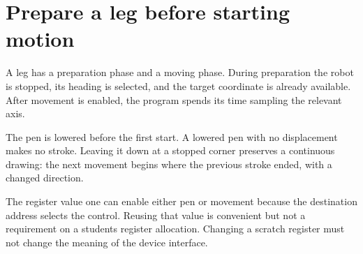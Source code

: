 \section{Prepare a leg before starting
  motion}\label{006-marsbot-square-p04-prepare-a-leg-before-starting-motion}

A leg has a preparation phase and a moving phase. During preparation the
robot is stopped, its heading is selected, and the target coordinate is
already available. After movement is enabled, the program spends its
time sampling the relevant axis.

The pen is lowered before the first start. A lowered pen with no
displacement makes no stroke. Leaving it down at a stopped corner
preserves a continuous drawing: the next movement begins where the
previous stroke ended, with a changed direction.

The register value one can enable either pen or movement because the
destination address selects the control. Reusing that value is
convenient but not a requirement on a student\textquotesingle s register
allocation. Changing a scratch register must not change the meaning of
the device interface.
